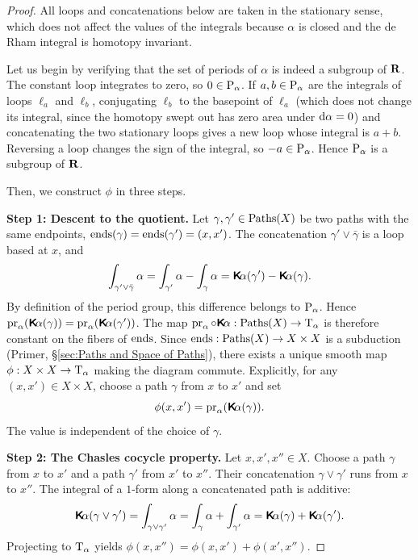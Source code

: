 \documentclass[10pt,reqno,letterpaper,twoside]{amsbook}
\begin{document}
  \begin{proof}
    All loops and concatenations below are taken in the stationary sense,
    which does not affect the values of the integrals
    because $\alpha$ is closed and the de Rham integral is homotopy invariant.
    
    Let us begin by verifying that the set of periods of $\alpha$ is indeed a subgroup of ${\mathbf{R}}$.
    The constant loop integrates to zero, so $0 \in \operatorname{P}_\alpha$.
    If $a,b \in \operatorname{P}_\alpha$ are the integrals of loops $\ell_a$ and $\ell_b$,
    conjugating $\ell_b$ to the basepoint of $\ell_a$ (which does not change
    its integral, since the homotopy swept out has zero area under $\mathrm{d}\alpha = 0$)
    and concatenating the two stationary loops
    gives a new loop whose integral is $a+b$.
    Reversing a loop changes the sign of the integral,
    so $-a \in \operatorname{P}_\alpha$.
    Hence $\operatorname{P}_\alpha$ is a subgroup of ${\mathbf{R}}$.
    
    Then,
    we construct $\phi$ in three steps.
    
    \textbf{Step 1: Descent to the quotient.}
    Let $\gamma, \gamma' \in \operatorname{Paths}(X)$ be two paths with the same endpoints,
    $\operatorname{ends}(\gamma) = \operatorname{ends}(\gamma') = (x,x')$.
    The concatenation $\gamma' \vee \bar\gamma$ is a loop based at $x$,
    and
    \[
      \int_{\gamma' \vee \bar\gamma} \alpha
      = \int_{\gamma'} \alpha - \int_\gamma \alpha
      = \boldsymbol{\mathsf{K}}\!\alpha(\gamma') - \boldsymbol{\mathsf{K}}\!\alpha(\gamma).
      \]%
    By definition of the period group,
    this difference belongs to $\operatorname{P}_\alpha$.
    Hence $\Proj_\alpha(\Kalpha(\gamma)) = \Proj_\alpha(\Kalpha(\gamma'))$.
    The map $\Proj_\alpha \circ \Kalpha: \Paths(X) \to \Torus_\alpha$
    is therefore constant on the fibers of $\operatorname{ends}$.
    Since $\operatorname{ends}: \operatorname{Paths}(X) \to X \times X$ is a subduction
    (Primer, \S\ref{sec:Paths and Space of Paths}),
    there exists a unique smooth map $\phi: X \times X \to \mathrm{T}_\alpha$
    making the diagram commute.
    Explicitly,
    for any $(x,x') \in X \times X$,
    choose a path $\gamma$ from $x$ to $x'$ and set
    \[
      \phi(x,x') = \Proj_\alpha(\Kalpha(\gamma)).
      \]%
    The value is independent of the choice of $\gamma$.
    
    \textbf{Step 2: The Chasles cocycle property.}
    Let $x,x',x'' \in X$.
    Choose a path $\gamma$ from $x$ to $x'$ and a path $\gamma'$ from $x'$ to $x''$.
    Their concatenation $\gamma \vee \gamma'$ runs from $x$ to $x''$.
    The integral of a $1$-form along a concatenated path is additive:
    \[
      \boldsymbol{\mathsf{K}}\!\alpha(\gamma \vee \gamma')
      = \int_{\gamma \vee \gamma'} \alpha
      = \int_\gamma \alpha + \int_{\gamma'} \alpha
      = \boldsymbol{\mathsf{K}}\!\alpha(\gamma) + \boldsymbol{\mathsf{K}}\!\alpha(\gamma').
      \]%
    Projecting to $\mathrm{T}_\alpha$ yields
    $\phi(x,x'') = \phi(x,x') + \phi(x',x'')$.
    

\end{proof}
\end{document}
